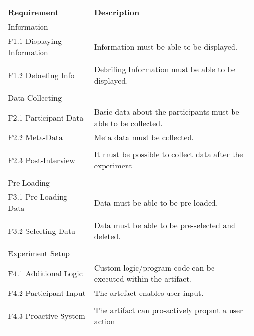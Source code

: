 \begin{table}
    \centering
    \small
    \begin{tabular}{L{0.35\textwidth}L{0.59\textwidth}}
    \hline
    Requirement                     & Description \\ \hline
    Information                 &             \\ \hline
    F1.1 Displaying Information     & Information must be able to be displayed.            \\
     & \\
    F1.2 Debrefing Info             & Debrifing Information must be able to be displayed.           \\
    & \\ \hline
    Data Collecting             &             \\ \hline
    F2.1 Participant Data           & Basic data about the participants must be able to be collected.           \\
    F2.2 Meta-Data                  & Meta data must be collected.            \\
    & \\
    F2.3 Post-Interview             & It must be possible to collect data after the experiment.            \\
    & \\  \hline
    Pre-Loading                 &             \\ \hline
    F3.1 Pre-Loading Data           & Data must be able to be pre-loaded.            \\
    & \\
    F3.2 Selecting Data             & Data must be able to be pre-selected and deleted.           \\
    & \\ \hline
    Experiment Setup            &             \\ \hline
    F4.1 Additional Logic           & Custom logic/program code can be executed within the artifact.            \\
    F4.2 Participant Input          & The artefact enables user input.            \\
    & \\
    F4.3 Proactive System           & The artifact can pro-actively propmt a user action           \\
    & \\ \hline

\end{tabular}
\end{table}

